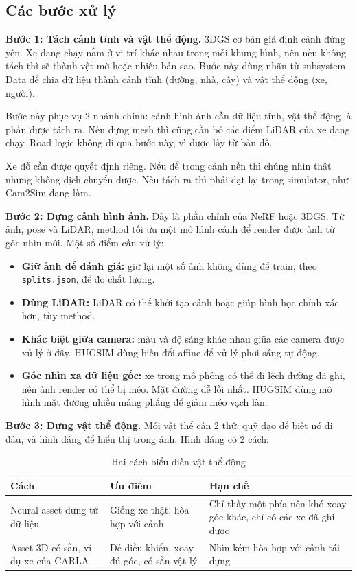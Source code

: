 \subsection{Các bước xử lý}

\textbf{Bước 1: Tách cảnh tĩnh và vật thể động.}
3DGS cơ bản giả định cảnh đứng yên. Xe đang chạy nằm ở vị trí khác nhau trong mỗi khung hình, nên nếu không tách thì sẽ thành vệt mờ hoặc nhiều bản sao.
Bước này dùng nhãn từ subsystem Data để chia dữ liệu thành cảnh tĩnh (đường, nhà, cây) và vật thể động (xe, người).

Bước này phục vụ 2 nhánh chính: cảnh hình ảnh cần dữ liệu tĩnh, vật thể động là phần được tách ra. Nếu dựng mesh thì cũng cần bỏ các điểm LiDAR của xe đang chạy.
Road logic không đi qua bước này, vì được lấy từ bản đồ.

Xe đỗ cần được quyết định riêng. Nếu để trong cảnh nền thì chúng nhìn thật nhưng không dịch chuyển được. Nếu tách ra thì phải đặt lại trong simulator, như Cam2Sim đang làm.

\textbf{Bước 2: Dựng cảnh hình ảnh.}
Đây là phần chính của NeRF hoặc 3DGS. Từ ảnh, pose và LiDAR, method tối ưu một mô hình cảnh để render được ảnh từ góc nhìn mới.
Một số điểm cần xử lý:
\begin{itemize}
  \item \textbf{Giữ ảnh để đánh giá:} giữ lại một số ảnh không dùng để train, theo \texttt{splits.json}, để đo chất lượng.
  \item \textbf{Dùng LiDAR:} LiDAR có thể khởi tạo cảnh hoặc giúp hình học chính xác hơn, tùy method.
  \item \textbf{Khác biệt giữa camera:} màu và độ sáng khác nhau giữa các camera được xử lý ở đây. HUGSIM dùng biến đổi affine để xử lý phơi sáng tự động.
  \item \textbf{Góc nhìn xa dữ liệu gốc:} xe trong mô phỏng có thể đi lệch đường đã ghi, nên ảnh render có thể bị méo. Mặt đường dễ lỗi nhất. HUGSIM dùng mô hình mặt đường nhiều mảng phẳng để giảm méo vạch làn.
\end{itemize}

\textbf{Bước 3: Dựng vật thể động.}
Mỗi vật thể cần 2 thứ: quỹ đạo để biết nó đi đâu, và hình dáng để hiển thị trong ảnh. Hình dáng có 2 cách:

\begin{table}[H]
  \centering
  \small
  \caption{Hai cách biểu diễn vật thể động}
  \begin{tabularx}{\linewidth}{>{\raggedright\arraybackslash}p{3cm} >{\raggedright\arraybackslash}X >{\raggedright\arraybackslash}X}
    \toprule
    \textbf{Cách} & \textbf{Ưu điểm} & \textbf{Hạn chế} \\
    \midrule
    Neural asset dựng từ dữ liệu & Giống xe thật, hòa hợp với cảnh & Chỉ thấy một phía nên khó xoay góc khác, chỉ có các xe đã ghi được \\
    \addlinespace
    Asset 3D có sẵn, ví dụ xe của CARLA & Dễ điều khiển, xoay đủ góc, có sẵn vật lý & Nhìn kém hòa hợp với cảnh tái dựng \\
    \bottomrule
  \end{tabularx}
\end{table}

